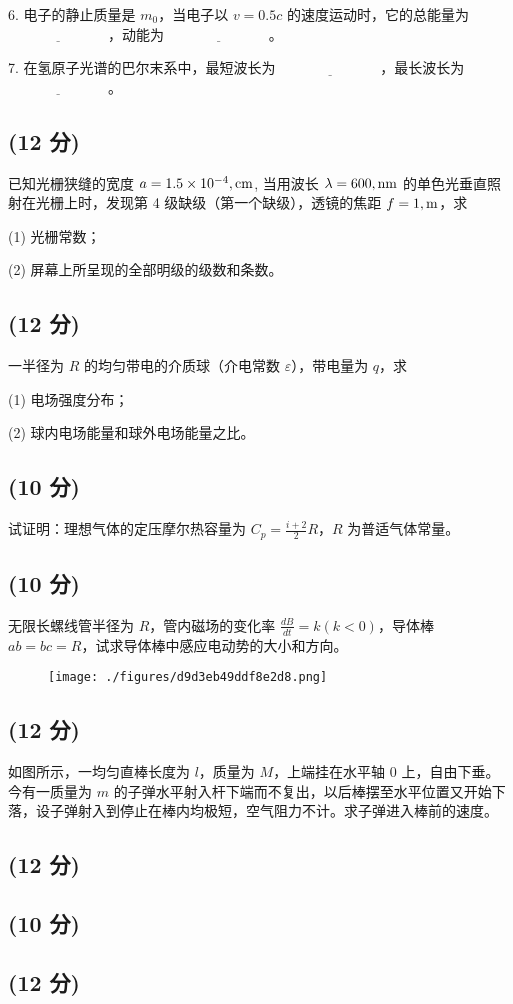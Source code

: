 6. 电子的静止质量是 $m_0$，当电子以 $v = 0.5c$ 的速度运动时，它的总能量为 $\underline{\hspace{3cm}}$，动能为 $\underline{\hspace{3cm}}$。

7. 在氢原子光谱的巴尔末系中，最短波长为 $\underline{\hspace{3cm}}$，最长波长为 $\underline{\hspace{3cm}}$。
\subsection{(12 分)}
已知光栅狭缝的宽度 $a = 1.5 \times 10^{-4} \\, \text{cm}$, 当用波长 $\lambda = 600 \\, \text{nm}$ 的单色光垂直照射在光栅上时，发现第 4 级缺级（第一个缺级），透镜的焦距 $f = 1 \\, \text{m}$，求

(1) 光栅常数；

(2) 屏幕上所呈现的全部明级的级数和条数。
\subsection{(12 分)}
一半径为 $R$ 的均匀带电的介质球（介电常数 $\varepsilon$），带电量为 $q$，求

(1) 电场强度分布；

(2) 球内电场能量和球外电场能量之比。
\subsection{(10 分)}
试证明：理想气体的定压摩尔热容量为 $C_p = \frac{i + 2}{2} R$，$R$ 为普适气体常量。
\subsection{(10 分)}
无限长螺线管半径为 $R$，管内磁场的变化率 $\frac{dB}{dt} = k (k < 0)$，导体棒 $ab = bc = R$，试求导体棒中感应电动势的大小和方向。
\begin{figure}[ht]
\centering
\texttt{[image: ./figures/d9d3eb49ddf8e2d8.png]}
\caption{} \label{fig_NJU08_3}
\end{figure}
\subsection{(12 分)}
如图所示，一均匀直棒长度为 \( l \)，质量为 \( M \)，上端挂在水平轴 0 上，自由下垂。今有一质量为 \( m \) 的子弹水平射入杆下端而不复出，以后棒摆至水平位置又开始下落，设子弹射入到停止在棒内均极短，空气阻力不计。求子弹进入棒前的速度。
\subsection{(12 分)}

\subsection{(10 分)}

\subsection{(12 分)}